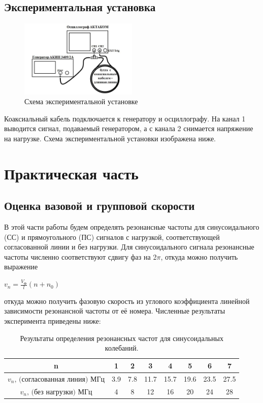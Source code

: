 \documentclass[a4paper,12pt]{article} %
\begin{document}
 \subsection*{Экспериментальная установка}
   \begin{figure}
  \vspace{-20pt}
  \begin{center}
    \includegraphics[width=0.5\textwidth]{plot/pic2.png}
    \caption{Схема экспериментальной установке}
  \end{center}
  \vspace{-10pt}
\end{figure}
 	Коаксиальный кабель подключается к генератору и осциллографу. На канал 1 выводится сигнал, подаваемый генератором, а с канала 2 снимается напряжение на нагрузке. Схема экспериментальной установки изображена ниже.

\clearpage

 
\section{Практическая часть}
\subsection{Оценка вазовой и групповой скорости}
В этой части работы будем определять резонансные частоты для синусоидального (СС) и прямоугольного (ПС) сигналов с нагрузкой, соответствующей согласованной линии и без нагрузки. 
Для синусоидального сигнала резонансные частоты численно соответствуют сдвигу фаз на 2$\pi$, откуда можно получить выражение

\begin{center}
   \large{$v_n = \frac{V_\text{Ф}}{l} (n+n_0)$}
\end{center}
откуда можно получить фазовую скорость из углового коэффициента линейной зависимости резонансной частоты от её номера. Численные результаты эксперимента приведены ниже:

\begin{table}[H]
    \centering
    \begin{tabular}{|c|c|c|c|c|c|c|c|} \hline
         n& 1 & 2 & 3 & 4 & 5 & 6 & 7\\ \hline
         $v_n \text{, (согласованная линия) МГц}$& 3.9 & 7.8 & 11.7 & 15.7 & 19.6 & 23.5 & 27.5\\ \hline
         $v_n \text{, (без нагрузки) МГц}$& 4 & 8 & 12 & 16 & 20 & 24 & 28\\ \hline
    \end{tabular}
    \caption{Результаты определения резонансных частот для синусоидальных колебаний.}
\end{table}
\end{document}
